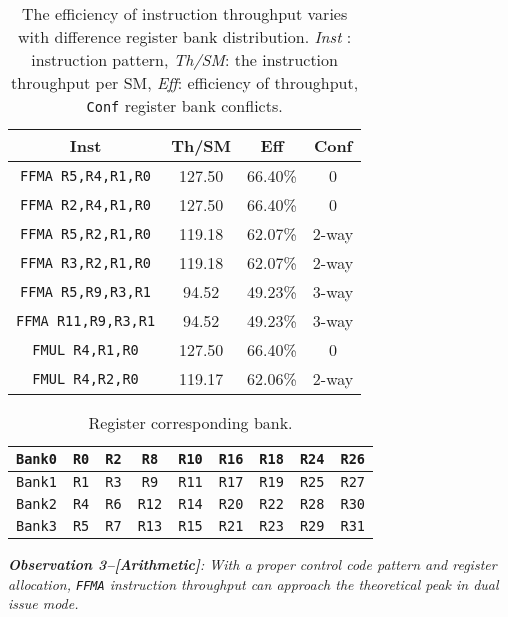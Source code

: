 \begin{table}[htbp]
    \caption{The efficiency of instruction throughput varies with difference register bank distribution. {\it Inst} : instruction pattern, {\it Th/SM}: the instruction throughput per SM, {\it Eff}: efficiency of throughput, {\tt Conf} register bank conflicts.}
\centering
\scalebox{1.0} {
\begin{tabular}{|c|c|c|c|}
\hline
Inst &Th/SM&Eff&Conf\\
\hline
{\tt FFMA R5,R4,R1,R0}&127.50&66.40\%&0\\
\hline
{\tt FFMA R2,R4,R1,R0}&127.50&66.40\%&0\\
\hline
{\tt FFMA R5,R2,R1,R0}&119.18&62.07\%&2-way\\
\hline
{\tt FFMA R3,R2,R1,R0}&119.18&62.07\%&2-way\\
\hline
{\tt FFMA R5,R9,R3,R1}&94.52&49.23\%&3-way\\
\hline
{\tt FFMA R11,R9,R3,R1}&94.52&49.23\%&3-way\\
\hline
{\tt FMUL R4,R1,R0}&127.50&66.40\%&0\\
\hline
{\tt FMUL R4,R2,R0}&119.17&62.06\%&2-way\\
\hline
\end{tabular}
}
\label{tab:th}
\end{table}


\begin{table}[htbp]
\caption{Register corresponding bank.}
\centering
\scalebox{1.0} {
\begin{tabular}{|c|c|c|c|c|c|c|c|c|}
\hline
    {\tt Bank0}&{\tt R0}&{\tt R2}&{\tt R8}&{\tt R10}&{\tt R16}&{\tt R18}&{\tt R24}&{\tt R26}\\
\hline
    {\tt Bank1}&{\tt R1}&{\tt R3}&{\tt R9}&{\tt R11}&{\tt R17}&{\tt R19}&{\tt R25}&{\tt R27} \\
\hline
    {\tt Bank2}&{\tt R4}&{\tt R6}&{\tt R12}&{\tt R14}&{\tt R20}&{\tt R22}&{\tt R28}&{\tt R30}\\
\hline
    {\tt Bank3}&{\tt R5}&{\tt R7}&{\tt R13}&{\tt R15}&{\tt R21}&{\tt R23}&{\tt R29}&{\tt R31}\\
\hline
\end{tabular}
}
\label{tab:reg}
\end{table}

{\em {\bf Observation 3--[Arithmetic]}: With a proper control code pattern and register allocation, {\tt FFMA} instruction throughput can approach the theoretical peak in dual issue mode.}

